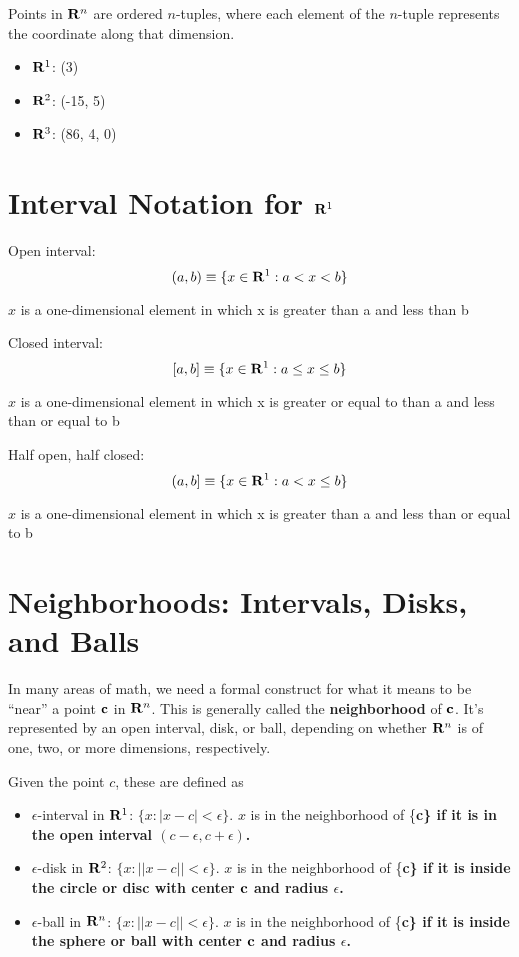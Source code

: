 \documentclass[]{book}
\providecommand{\tightlist}{%
  \setlength{\itemsep}{0pt}\setlength{\parskip}{0pt}}
\theoremstyle{definition}
\theoremstyle{definition}
\theoremstyle{definition}
\theoremstyle{remark}
\begin{document}
Points in \({\bf R}^n\) are ordered \(n\)-tuples, where each element of
the \(n\)-tuple represents the coordinate along that dimension.

\begin{itemize}
\tightlist
\item
  \({\bf R}^1\): (3)
\item
  \({\bf R}^2\): (-15, 5)
\item
  \({\bf R}^3\): (86, 4, 0)
\end{itemize}

\section{\texorpdfstring{Interval Notation for
\({\bf R}^1\)}{Interval Notation for \{\textbackslash{}bf R\}\^{}1}}\label{interval-notation-for-bf-r1}

Open interval: \[(a,b)\equiv \{ x\in{\bf R}^1: a<x<b\}\]

\(x\) is a one-dimensional element in which x is greater than a and less
than b

Closed interval: \[[a,b]\equiv \{ x\in{\bf R}^1: a\le x \le b\}\]

\(x\) is a one-dimensional element in which x is greater or equal to
than a and less than or equal to b

Half open, half closed: \[(a,b]\equiv \{ x\in{\bf R}^1: a<x\le b\}\]

\(x\) is a one-dimensional element in which x is greater than a and less
than or equal to b

\section{Neighborhoods: Intervals, Disks, and
Balls}\label{neighborhoods-intervals-disks-and-balls}

In many areas of math, we need a formal construct for what it means to
be ``near'' a point \(\bf c\) in \({\bf R}^n\). This is generally called
the \textbf{neighborhood} of \(\bf c\). It's represented by an open
interval, disk, or ball, depending on whether \({\bf R}^n\) is of one,
two, or more dimensions, respectively.

Given the point \(c\), these are defined as

\begin{itemize}
\tightlist
\item
  \(\epsilon\)-interval in \({\bf R}^1\): \(\{x : |x-c|<\epsilon \}\).
  \(x\) is in the neighborhood of \{\bf c\} if it is in the open
  interval \((c-\epsilon,c+\epsilon)\).
\item
  \(\epsilon\)-disk in \({\bf R}^2\): \(\{x : || x-c ||<\epsilon\}\).
  \(x\) is in the neighborhood of \{\bf c\} if it is inside the circle
  or disc with center \(\bf c\) and radius \(\epsilon\).
\item
  \(\epsilon\)-ball in \({\bf R}^n\): \(\{x : || x-c ||<\epsilon\}\).
  \(x\) is in the neighborhood of \{\bf c\} if it is inside the sphere
  or ball with center \(\bf c\) and radius \(\epsilon\).
\end{itemize}
\end{document}
